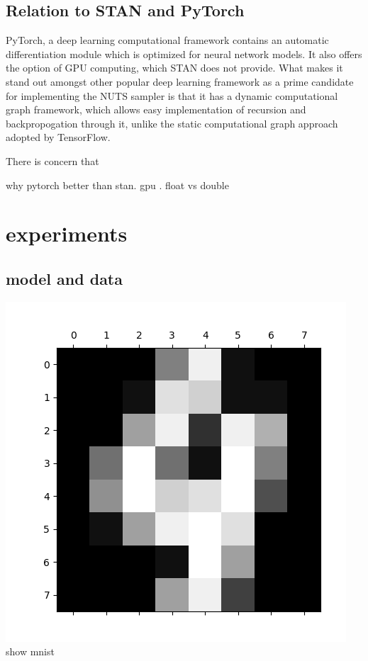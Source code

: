 \documentclass[]{report}
\begin{document}
\section{Relation to STAN and PyTorch}

PyTorch, a deep learning computational framework contains an automatic differentiation module which is optimized for neural network models. It also offers the option of GPU computing, which STAN does not provide. What makes it stand out amongst other popular deep learning framework as a prime candidate for implementing the NUTS sampler is that it has a dynamic computational graph framework, which allows easy implementation of recursion and backpropogation through it, unlike the static computational graph approach adopted by TensorFlow.

There is concern that 

why pytorch better than stan. gpu . float vs double 



\chapter{experiments}
\section{model and data}

\includegraphics{mnist1.png}
show mnist
\end{document}
